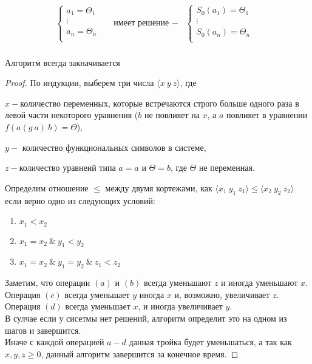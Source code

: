 	\begin{align*}
		\begin{cases}
			a_1=\Theta_1&\\
			\vdots&\\
			a_n=\Theta_n&\\
		\end{cases} & \text{имеет решение }-&\begin{cases}
			S_0(a_1)=\Theta_1&\\
			\vdots&\\
			S_0(a_n)=\Theta_n&\\
		\end{cases}\\
	\end{align*}
	\begin{statement}Алгоритм всегда закначивается\end{statement}
	\begin{proof}По индукции, выберем три числа $ \big \langle x\:y\:z\big \rangle$, где\par $x-$количество переменных, которые встречаются строго больше одного раза в левой части некоторого уравнения ($b$ не повлияет на $x$, а $a$ повлияет в уравнении $f(a(g\:a)\:b)=\Theta$),\par $y-$ количество функциональных символов в системе,\par $z-$количество уравнеий типа $a=a$ и $\Theta=b$, где $\Theta$ не переменная.\par Определим отношение $\leq$  между двумя кортежами,	 как $\big \langle x_1\:y_1\:z_1\big \rangle \leq \big \langle x_2\:y_2\:z_2\big \rangle$ если верно одно из следующих условий: \begin{enumerate}
	\item $x_1 < x_2$
	\item $x_1 = x_2 \:\& \:y_1 < y_2$
	\item $x_1 = x_2 \:\&  \:y_1 = y_2 \:\& \:z_1 < z_2$
	\end{enumerate}
		Заметим, что операции $(a)$ и $(b)$ всегда уменьшают $z$ и иногда уменьшают $x$.\\ Операция $(c)$ всегда уменьшает $y$ иногда $x$ и, возможно, увеличивает $z$. \\
		Операция $(d)$ всегда уменьшает $x$, и иногда увеличивает $y$. \\
		В сулчае если у сисетмы нет решений, алгоритм определит это на одном из шагов и завершится. \\
		Иначе с каждой операцией $a-d$ данная тройка будет уменьшаться, а так как $x,y,z\geq 0$, данный алгоритм завершится за конечное время.
		\end{proof} 

